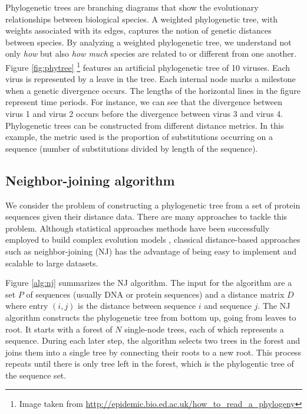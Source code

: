 \documentclass[11pt,letterpaper]{article}
\theoremstyle{definition}
\begin{document}
Phylogenetic trees are branching diagrams that show the evolutionary relationships between biological species. A weighted phylogenetic tree, with weights associated with its edges, captures the notion of genetic distances between species. By analyzing a weighted phylogenetic tree, we understand not only \textit{how} but also \textit{how much} species are related to or different from one another. Figure \ref{fig:phytree} \footnote{Image taken from \url{http://epidemic.bio.ed.ac.uk/how_to_read_a_phylogeny}} features an artificial phylogenetic tree of 10 viruses. Each virus is represented by a leave in the tree. Each internal node marks a milestone when a genetic divergence occurs. The lengths of the horizontal lines in the figure represent time periods. For instance, we can see that the divergence between virus 1 and virus 2 occurs before the divergence between virus 3 and virus 4. Phylogenetic trees can be constructed from different distance metrics. In this example, the metric used is the proportion of substitutions occurring on a sequence (number of substitutions divided by length of the sequence). 

\subsection{Neighbor-joining algorithm}

We consider the problem of constructing a phylogenetic tree from a set of protein sequences given their distance data. There are many approaches to tackle this problem. Although statistical approaches methods have been successfully employed to build complex evolution models \cite{felsenstein1981evolutionary}, classical distance-based approaches such as neighbor-joining (NJ) has the advantage of being easy to implement and scalable to large datasets. 

Figure \ref{alg:nj} summarizes the NJ algorithm. The input for the algorithm are a set $P$ of sequences (usually DNA or protein sequences) and a distance matrix $D$ where entry $(i, j)$ is the distance between sequence $i$ and sequence $j$. The NJ algorithm constructs the phylogenetic tree from bottom up, going from leaves to root. It starts with a forest of $N$ single-node trees, each of which represents a sequence. During each later step, the algorithm selects two trees in the forest and joins them into a single tree by connecting their roots to a new root. This process repeats until there is only tree left in the forest, which is the phylogentic tree of the sequence set.
\end{document}
